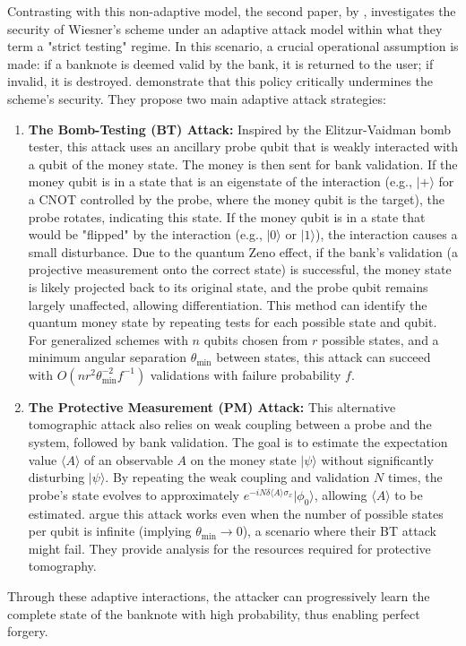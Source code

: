 \documentclass{article} %
\begin{document}
Contrasting with this non-adaptive model, the second paper, by \citet{Nagaj2016Adaptive}, investigates the security of Wiesner's scheme under an adaptive attack model within what they term a "strict testing" regime. In this scenario, a crucial operational assumption is made: if a banknote is deemed valid by the bank, it is returned to the user; if invalid, it is destroyed. \citet{Nagaj2016Adaptive} demonstrate that this policy critically undermines the scheme's security. They propose two main adaptive attack strategies:
\begin{enumerate}
    \item \textbf{The Bomb-Testing (BT) Attack:} Inspired by the Elitzur-Vaidman bomb tester, this attack uses an ancillary probe qubit that is weakly interacted with a qubit of the money state. The money is then sent for bank validation. If the money qubit is in a state that is an eigenstate of the interaction (e.g., $|+\rangle$ for a CNOT controlled by the probe, where the money qubit is the target), the probe rotates, indicating this state. If the money qubit is in a state that would be "flipped" by the interaction (e.g., $|0\rangle$ or $|1\rangle$), the interaction causes a small disturbance. Due to the quantum Zeno effect, if the bank's validation (a projective measurement onto the correct state) is successful, the money state is likely projected back to its original state, and the probe qubit remains largely unaffected, allowing differentiation. This method can identify the quantum money state by repeating tests for each possible state and qubit. For generalized schemes with $n$ qubits chosen from $r$ possible states, and a minimum angular separation $\theta_{\min}$ between states, this attack can succeed with $O(nr^2\theta_{\min}^{-2}f^{-1})$ validations with failure probability $f$.
    \item \textbf{The Protective Measurement (PM) Attack:} This alternative tomographic attack also relies on weak coupling between a probe and the system, followed by bank validation. The goal is to estimate the expectation value $\langle A \rangle$ of an observable $A$ on the money state $| \psi \rangle$ without significantly disturbing $|\psi\rangle$. By repeating the weak coupling and validation $N$ times, the probe's state evolves to approximately $e^{-iN\delta\langle A \rangle \sigma_x} |\phi_0\rangle$, allowing $\langle A \rangle$ to be estimated. \citet{Nagaj2016Adaptive} argue this attack works even when the number of possible states per qubit is infinite (implying $\theta_{\min} \to 0$), a scenario where their BT attack might fail. They provide analysis for the resources required for protective tomography.
\end{enumerate}
Through these adaptive interactions, the attacker can progressively learn the complete state of the banknote with high probability, thus enabling perfect forgery.
\end{document}
